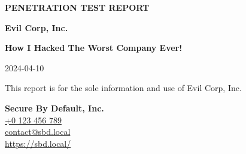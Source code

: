 \documentclass[a4paper]{article}
\begin{document}
\pagestyle{fancy}
\fancyhf{} %

\begin{titlepage}

  \vspace*{\fill}

  \begin{center}
  \end{center}

  \vfill
  
  {
    \Huge \textbf{\MakeUppercase{Penetration Test Report}}
    \vspace{1ex}
  }

  {
    \Large \textbf{Evil Corp, Inc.}
  }

  {
    \Large \textbf{How I Hacked The Worst Company Ever!}
  }

  2024-04-10
\end{titlepage}


\fancyfoot[C]{\thepage}

{
  \vspace*{\fill}

  This report is for the sole information and use of Evil Corp, Inc.

  \textbf{Secure By Default, Inc.} \\
  \href{tel:+0123456789}{+0 123 456 789} \\
  \href{mailto:contact@sbd.local}{contact@sbd.local} \\
  \href{https://sbd.local/}{https://sbd.local/}
}
\end{document}
